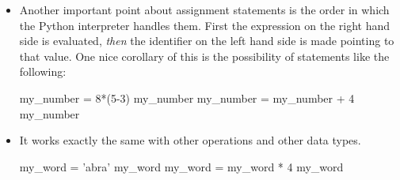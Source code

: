 \documentclass[a4paper]{article}
\begin{document}
\begin{itemize}
you mean that the name \Verb+<identifier>+ points to the object \Verb+value+.
After that whenever you use the name \Verb+<identifier>+ in an expression, it
gets evaluated to the object/value it points to. On the other hand, when you
say:

\begin{pygments}[frame=single]{python}
<identifier1> = <identifier2>
\end{pygments}

you mean that the name \Verb+<identifier1>+ points to the same object/value that
the name \Verb+<identifier2>+ points to. You do not establish a direct
connection between the two identifiers; therefore manipulating one, does not
effect the other.\footnote{Take the sentence `John goes shopping on the same
day as Mary'. The two possible readings of this sentence are:
\begin{itemize}
\item[](R1) Mary goes to shopping on a certain day (say Monday), and that day is
also the day for John to go shopping.
\item[](R2) Whichever day Mary goes shopping, John does too on that day; John
follows Mary's shopping schedule day-to-day.  
\end{itemize} 
The relation between identifiers we are concerned here is of type R1 rather than R2. This relates to
the issue of extension versus intension.
}


\item Another important point about assignment statements is the order in which
the Python interpreter handles them. First the expression on the right hand side
is evaluated, \emph{then} the identifier on the left hand side is made pointing
to that value. One nice corollary of this is the possibility of statements like
the following:


\begin{ucodeframe}
\begin{pyconsole}
my_number = 8*(5-3) 
my_number
my_number = my_number + 4 
my_number
\end{pyconsole}
\end{ucodeframe}

\item It works exactly the same with other operations and other data types.

\begin{ucodeframe}
\begin{pyconsole}
my_word = 'abra' 
my_word
my_word = my_word * 4 
my_word
\end{pyconsole}
\end{ucodeframe}


\end{itemize}
\end{document}
